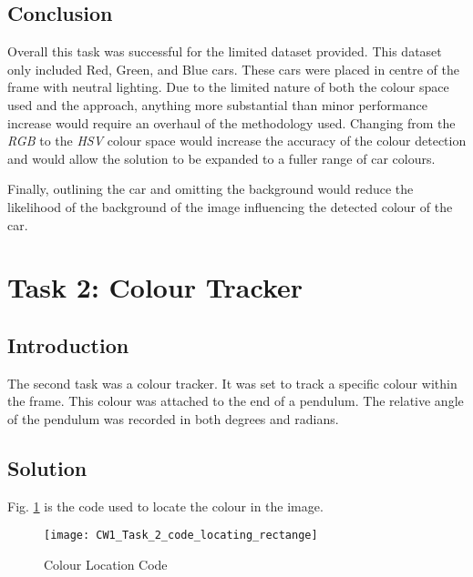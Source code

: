 \documentclass[conference]{IEEEtran}
\begin{document}
\subsection{Conclusion}

Overall this task was successful for the limited dataset provided. This dataset only included Red, Green, and Blue cars. These cars were placed in centre of the frame with neutral lighting. Due to the limited nature of both the colour space used and the approach, anything more substantial than minor performance increase would require an overhaul of the methodology used. Changing from the \textit{RGB} to the \textit{HSV} colour space would increase the accuracy of the colour detection and would allow the solution to be expanded to a fuller range of car colours. 

Finally, outlining the car and omitting the background would reduce the likelihood of the background of the image influencing the detected colour of the car.

\section{Task 2: Colour Tracker}

\subsection{Introduction}

The second task was a colour tracker. It was set to track a specific colour within the frame. This colour was attached to the end of a pendulum. The relative angle of the pendulum was recorded in both degrees and radians. 

\subsection{Solution}
Fig. \ref{fig:CW1_Task_2_code_locating_rectange} is the code used to locate the colour in the image. 

\begin{figure}
\centerline{\texttt{[image: CW1\_Task\_2\_code\_locating\_rectange]}}
\caption{Colour Location Code}
\label{fig:CW1_Task_2_code_locating_rectange}
\end{figure}
\end{document}
